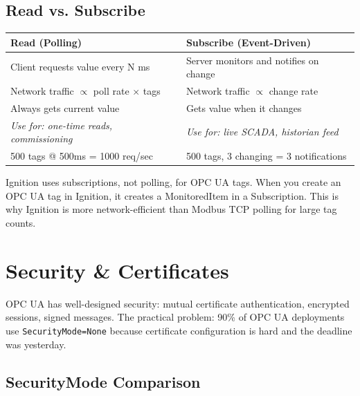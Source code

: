 \documentclass[12pt,twoside,openright]{memoir}
\begin{document}
\section{Read vs. Subscribe}

\begin{tcolorbox}[title={Read vs Subscribe Comparison}, colback=white, colframe=opcuablue, arc=4pt]
\begin{tabular}{p{}p{}}
\textbf{Read (Polling)} & \textbf{Subscribe (Event-Driven)} \\
\hline
Client requests value every N ms & Server monitors and notifies on change \\
Network traffic $\propto$ poll rate $\times$ tags & Network traffic $\propto$ change rate \\
Always gets current value & Gets value when it changes \\
\textit{Use for: one-time reads, commissioning} & \textit{Use for: live SCADA, historian feed} \\
500 tags @ 500ms = 1000 req/sec & 500 tags, 3 changing = 3 notifications \\
\end{tabular}
\end{tcolorbox}

\begin{fieldgotcha}
Ignition uses subscriptions, not polling, for OPC UA tags. When you create an OPC UA tag in Ignition, it
creates a MonitoredItem in a Subscription. This is why Ignition is more network-efficient than Modbus TCP
polling for large tag counts.
\end{fieldgotcha}

\chapter{Security \& Certificates}

OPC UA has well-designed security: mutual certificate authentication, encrypted sessions, signed messages.
The practical problem: 90\% of OPC UA deployments use \texttt{SecurityMode=None} because certificate
configuration is hard and the deadline was yesterday.

\section{SecurityMode Comparison}
\end{document}

